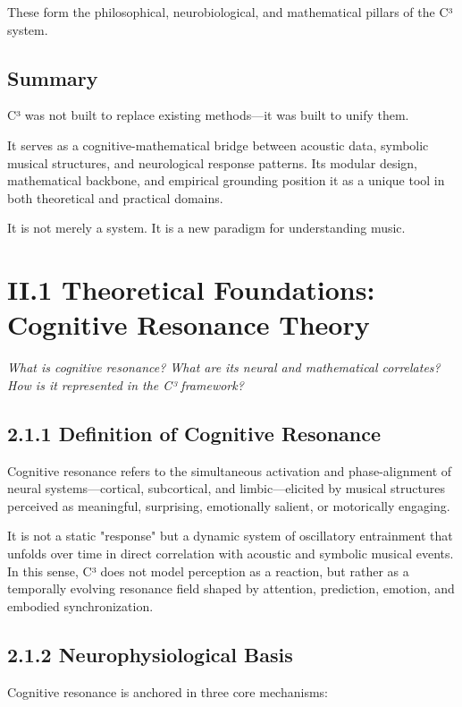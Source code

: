 These form the philosophical, neurobiological, and mathematical pillars of the C³ system.

\subsection*{Summary}

C³ was not built to replace existing methods—it was built to unify them.

It serves as a cognitive-mathematical bridge between acoustic data, symbolic musical structures, and neurological response patterns. Its modular design, mathematical backbone, and empirical grounding position it as a unique tool in both theoretical and practical domains.

It is not merely a system. It is a new paradigm for understanding music.

\section*{II.1 Theoretical Foundations: Cognitive Resonance Theory}

\textit{What is cognitive resonance? What are its neural and mathematical correlates? How is it represented in the C³ framework?}

\subsection*{2.1.1 Definition of Cognitive Resonance}

Cognitive resonance refers to the simultaneous activation and phase-alignment of neural systems—cortical, subcortical, and limbic—elicited by musical structures perceived as meaningful, surprising, emotionally salient, or motorically engaging.

It is not a static "response" but a dynamic system of oscillatory entrainment that unfolds over time in direct correlation with acoustic and symbolic musical events. In this sense, C³ does not model perception as a reaction, but rather as a temporally evolving resonance field shaped by attention, prediction, emotion, and embodied synchronization.

\subsection*{2.1.2 Neurophysiological Basis}

Cognitive resonance is anchored in three core mechanisms:

